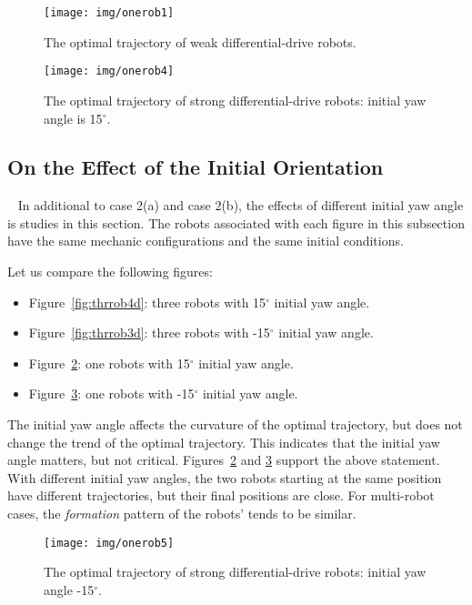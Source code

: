 \begin{figure}
  \centering
  \texttt{[image: img/onerob1]}\\
  \caption{The optimal trajectory of weak differential-drive robots.}\label{fig:onerob1}
\end{figure}

\begin{figure}
   \centering
  \texttt{[image: img/onerob4]}\\
  \caption{The optimal trajectory of strong differential-drive robots: initial yaw angle is 15$^\circ$.}\label{fig:onerob4}
\end{figure}


\subsection{On the Effect of the  Initial Orientation}~\label{s:ori}
    In additional to case 2(a) and case 2(b), the effects of different initial yaw angle is studies in this section.
    The robots associated with each figure in this subsection have the same mechanic configurations and the same initial conditions.

  Let us  compare the following figures:
    \begin{itemize}
        \item Figure~\ref{fig:thrrob4d}: three robots with 15$^\circ$ initial yaw angle.
        \item Figure~\ref{fig:thrrob3d}: three robots with -15$^\circ$ initial yaw angle.
        \item Figure~\ref{fig:onerob4}: one robots with 15$^\circ$ initial yaw angle.
        \item Figure~\ref{fig:onerob5}: one robots with -15$^\circ$ initial yaw angle.
       \end{itemize}
The initial yaw angle affects the curvature of the optimal trajectory, but does not change the trend of the optimal trajectory. This indicates that the initial yaw angle matters, but not critical. Figures~\ref{fig:onerob4} and \ref{fig:onerob5} support the above statement. With different initial yaw angles, the two robots starting at the same position have different trajectories, but their final positions are close. For multi-robot cases, the {\it formation} pattern of the robots' tends to be similar. 


\begin{figure}[h!]
    \centering
  \texttt{[image: img/onerob5]}\\
  \caption{The optimal trajectory of strong differential-drive robots: initial yaw angle   -15$^\circ$.}\label{fig:onerob5}
\end{figure}

